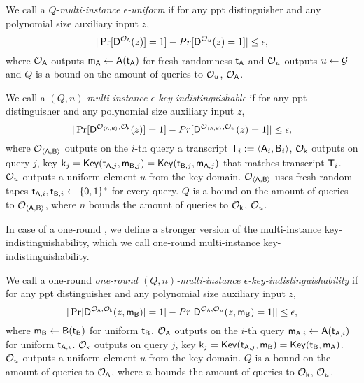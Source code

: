\begin{definition}
We call a \UKA $Q$-\emph{multi-instance $\epsilon$-uniform} if for any ppt distinguisher \D and any polynomial size auxiliary input $z$,
$$
|\Pr[\mathsf D^{\mathcal{O}_{\mathsf{A}}}(z)]=1]-Pr[\mathsf D^{\mathcal{O}_{u}}(z)=1]|\leq \epsilon,
$$
where $\mathcal{O}_{\mathsf{A}}$ outputs $\mathsf{m}_\mathsf{A}\leftarrow\mathsf{A}(\mathsf{t}_\mathsf{A})$ for fresh randomness $\mathsf{t}_\mathsf{A}$ and $\mathcal{O}_u$ outputs $u\leftarrow\mathcal{G}$ and $Q$ is a bound on the amount of queries to $\mathcal{O}_{u}$, $\mathcal{O}_{\mathsf{A}}$.
\end{definition}



\begin{definition}
We call a \UKA $(Q,n)$-\emph{multi-instance $\epsilon$-key-indistinguishable} if for any ppt distinguisher \D and any polynomial size auxiliary input $z$,
$$
|\Pr[\mathsf D^{\mathcal{O}_{\langle \mathsf{A},\mathsf{B}\rangle}, \mathcal{O}_{\mathsf{k}}}(z)]=1]-Pr[\mathsf D^{\mathcal{O}_{\langle \mathsf{A},\mathsf{B}\rangle},\mathcal{O}_{u}}(z)=1]|\leq \epsilon,
$$
where $\mathcal{O}_{\langle \mathsf{A},\mathsf{B}\rangle}$ outputs on the $i$-th query a transcript $\mathsf{T}_i:=\langle \mathsf{A}_i,\mathsf{B}_i\rangle$, $\mathcal{O}_{\mathsf{k}}$ outputs on query $j$, key $\mathsf{k}_j=\mathsf{Key}(\mathsf{t}_{\mathsf{A},j},\mathsf{m}_{\mathsf{B},j})=\mathsf{Key}(\mathsf{t}_{\mathsf{B},j},\mathsf{m}_{\mathsf{A},j})$ that matches transcript $\mathsf{T}_i$. $\mathcal{O}_u$ outputs a uniform element $u$ from the key domain. $\mathcal{O}_{\langle \mathsf{A},\mathsf{B}\rangle}$ uses fresh random tapes $\mathsf{t}_{\mathsf{A},i},\mathsf{t}_{\mathsf{B},i}\leftarrow\{0,1\}^*$ for every query. $Q$ is a bound on the amount of queries to $\mathcal{O}_{\langle \mathsf{A},\mathsf{B}\rangle}$, where $n$ bounds the amount of queries to $\mathcal{O}_{\mathsf{k}}$, $\mathcal{O}_{u}$. 
\end{definition}

In case of a one-round \UKA, we define a stronger version of the multi-instance key-indistinguishability, which we call one-round multi-instance key-indistinguishability.

\begin{definition}
We call a one-round \UKA \emph{one-round $(Q,n)$-multi-instance $\epsilon$-key-indistinguishability} if for any ppt distinguisher \D and any polynomial size auxiliary input $z$,
$$
|\Pr[\mathsf D^{\mathcal{O}_{\mathsf{A}}, \mathcal{O}_{\mathsf{k}}}(z,\mathsf{m}_\mathsf{B})]=1]-Pr[\mathsf D^{\mathcal{O}_{\mathsf{A}},\mathcal{O}_{u}}(z,\mathsf{m}_\mathsf{B})=1]|\leq\epsilon,
$$
where $\mathsf{m}_{\mathsf{B}}\leftarrow\mathsf{B}(\mathsf{t}_{\mathsf{B}})$ for uniform $\mathsf{t}_{\mathsf{B}}$. $\mathcal{O}_{\mathsf{A}}$ outputs on the $i$-th query $\mathsf{m}_{\mathsf{A},i}\leftarrow \mathsf{A}(\mathsf{t}_{\mathsf{A},i})$ for uniform $\mathsf{t}_{\mathsf{A},i}$. $\mathcal{O}_{\mathsf{k}}$ outputs on query $j$, key $\mathsf{k}_j=\mathsf{Key}(\mathsf{t}_{\mathsf{A},j},\mathsf{m}_{\mathsf{B}})=\mathsf{Key}(\mathsf{t}_{\mathsf{B}},\mathsf{m}_{\mathsf{A}})$. $\mathcal{O}_u$ outputs a uniform element $u$ from the key domain. $Q$ is a bound on the amount of queries to $\mathcal{O}_{\mathsf{A}}$, where $n$ bounds the amount of queries to $\mathcal{O}_{\mathsf{k}}$, $\mathcal{O}_{u}$. 
\end{definition}

